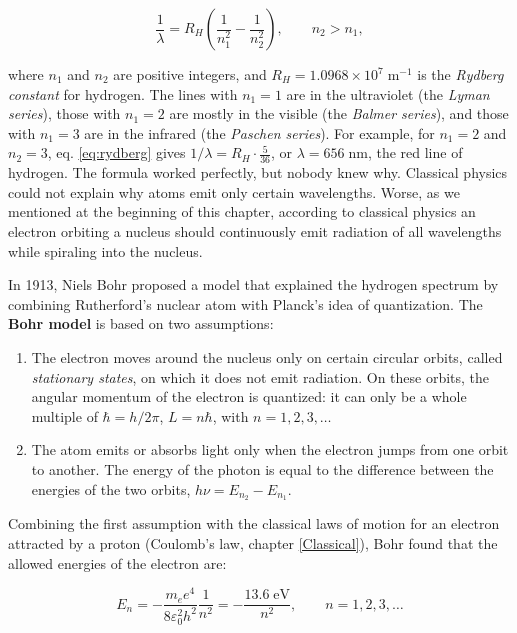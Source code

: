 \documentclass[
  english,
  9pt,
]{extbook}
\providecommand{\tightlist}{%
  \setlength{\itemsep}{0pt}\setlength{\parskip}{0pt}}
\theoremstyle{definition}
\theoremstyle{definition}
\theoremstyle{definition}
\theoremstyle{definition}
\theoremstyle{remark}
\begin{document}
\begin{equation}
\frac{1}{\lambda} = R_H\left(\frac{1}{n_1^2}-\frac{1}{n_2^2}\right), \qquad n_2 > n_1,
\label{eq:rydberg}
\end{equation}

where \(n_1\) and \(n_2\) are positive integers, and \(R_H=1.0968\times10^{7}\;\text{m}^{-1}\) is the \emph{Rydberg constant} for hydrogen. The lines with \(n_1=1\) are in the ultraviolet (the \emph{Lyman series}), those with \(n_1=2\) are mostly in the visible (the \emph{Balmer series}), and those with \(n_1=3\) are in the infrared (the \emph{Paschen series}). For example, for \(n_1=2\) and \(n_2=3\), eq. \eqref{eq:rydberg} gives \(1/\lambda=R_H\cdot\frac{5}{36}\), or \(\lambda=656\;\text{nm}\), the red line of hydrogen. The formula worked perfectly, but nobody knew why. Classical physics could not explain why atoms emit only certain wavelengths. Worse, as we mentioned at the beginning of this chapter, according to classical physics an electron orbiting a nucleus should continuously emit radiation of all wavelengths while spiraling into the nucleus.

In 1913, Niels Bohr proposed a model that explained the hydrogen spectrum by combining Rutherford's nuclear atom with Planck's idea of quantization. The \textbf{Bohr model} is based on two assumptions:

\begin{enumerate}
\def\labelenumi{\arabic{enumi}.}
\tightlist
\item
  The electron moves around the nucleus only on certain circular orbits, called \emph{stationary states}, on which it does not emit radiation. On these orbits, the angular momentum of the electron is quantized: it can only be a whole multiple of \(\hbar=h/2\pi\), \(L=n\hbar\), with \(n=1,2,3,\ldots\)
\item
  The atom emits or absorbs light only when the electron jumps from one orbit to another. The energy of the photon is equal to the difference between the energies of the two orbits, \(h\nu=E_{n_2}-E_{n_1}\).
\end{enumerate}

Combining the first assumption with the classical laws of motion for an electron attracted by a proton (Coulomb's law, chapter \ref{Classical}), Bohr found that the allowed energies of the electron are:

\begin{equation}
E_n = -\frac{m_e e^4}{8\varepsilon_0^2h^2}\frac{1}{n^2} = -\frac{13.6\;\text{eV}}{n^2}, \qquad n=1,2,3,\ldots
\label{eq:bohr1}
\end{equation}
\end{document}
